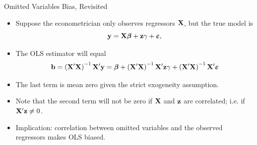 

\begin{frame}{Omitted Variables Bias, Revisited}
\begin{itemize}
	\item Suppose the econometrician only observes regressors ${\bf X} $, but the true model is\[
			{\bf y}= {\bf X} \boldsymbol{\beta} + {\bf z} \gamma + \boldsymbol{\varepsilon},
	\]

	\item The OLS estimator will equal\[
	{\bf b} = \left({\bf X}'{\bf X}\right)^{-1} {\bf X}' {\bf y} = \boldsymbol{\beta}  + \left({\bf X}'{\bf X}\right)^{-1} {\bf X}' {\bf z} \gamma + \left({\bf X}'{\bf X}\right)^{-1} {\bf X}' \boldsymbol{\varepsilon}
	\]

	\item The last term is mean zero given the strict exogeneity assumption.

	\item Note that the second term will not be zero if ${\bf X}$ and ${\bf z}$ are correlated;
	i.e. if $ {\bf X}' {\bf z} \ne 0$.

	\item Implication:  correlation between omitted variables and the observed regressors makes OLS biased.
\end{itemize}
\end{frame}

